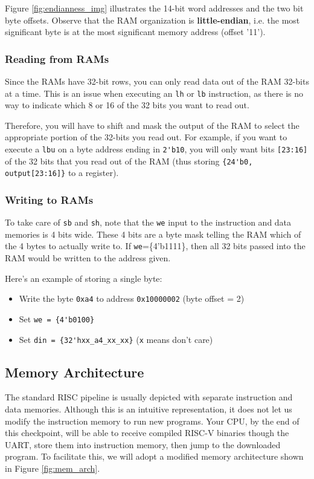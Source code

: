 \documentclass[11pt]{article}
\begin{document}
Figure \ref{fig:endianness_img} illustrates the 14-bit word addresses and the two bit byte offsets.
Observe that the RAM organization is \textbf{little-endian}, i.e. the most significant byte is at the most significant memory address (offset '11').

\subsubsection{Reading from RAMs}
Since the RAMs have 32-bit rows, you can only read data out of the RAM 32-bits at a time.
This is an issue when executing an \verb|lh| or \verb|lb| instruction, as there is no way to indicate which 8 or 16 of the 32 bits you want to read out.

Therefore, you will have to shift and mask the output of the RAM to select the appropriate portion of the 32-bits you read out.
For example, if you want to execute a \verb|lbu| on a byte address ending in \verb|2'b10|, you will only want bits \verb|[23:16]| of the 32 bits that you read out of the RAM (thus storing \verb|{24'b0, output[23:16]}| to a register).

\subsubsection{Writing to RAMs}
To take care of \verb|sb| and \verb|sh|, note that the \verb|we| input to the instruction and data memories is 4 bits wide.
These 4 bits are a byte mask telling the RAM which of the 4 bytes to actually write to.
If \verb|we|=\{4'b1111\}, then all 32 bits passed into the RAM would be written to the address given.

Here's an example of storing a single byte:
\begin{itemize}
  \item Write the byte \verb|0xa4| to address \verb|0x10000002| (byte offset = 2)
  \item Set \verb|we = {4'b0100}|
  \item Set \verb|din = {32'hxx_a4_xx_xx}| (\verb|x| means don't care)
\end{itemize}

\subsection{Memory Architecture}
The standard RISC pipeline is usually depicted with separate instruction and data memories.
Although this is an intuitive representation, it does not let us modify the instruction memory to run new programs.
Your CPU, by the end of this checkpoint, will be able to receive compiled RISC-V binaries though the UART, store them into instruction memory, then jump to the downloaded program.
To facilitate this, we will adopt a modified memory architecture shown in Figure \ref{fig:mem_arch}.
\end{document}
